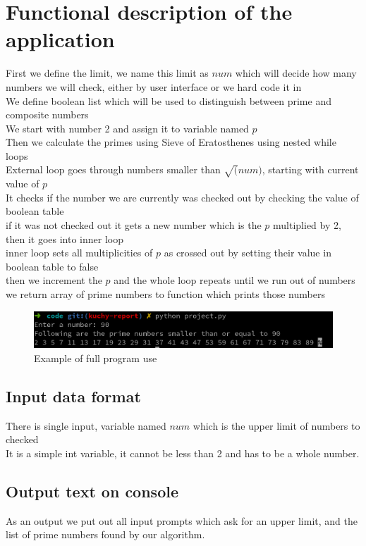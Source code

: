 \documentclass[12pt]{article}
\begin{document}
\section{Functional description of the application}
First we define the limit, we name this limit as $num$ which will decide how many numbers we will check, either by user interface or we hard code it in \\ 
We define boolean list which will be used to distinguish between prime and composite numbers \\ 
We start with number 2 and assign it to variable named $p$ \\ 
Then we calculate the primes using Sieve of Eratosthenes using nested while loops \\ 
External loop goes through numbers smaller than $\sqrt(num)$, starting with current value of $p$ \\ 
It checks if the number we are currently was checked out by checking the value of boolean table \\ 
if it was not checked out it gets a new number which is the $p$ multiplied by 2, then it goes into inner loop \\ 
inner loop sets all multiplicities of $p$ as crossed out by setting their value in boolean table to false \\ 
then we increment the $p$ and the whole loop repeats until we run out of numbers \\ 
we return array of prime numbers to function which prints those numbers 

\begin{figure}[H]
    \caption{Example of full program use }
\centering
\includegraphics[width=\textwidth]
{screenshoot/program_use.png}
\end{figure}

\subsection{Input data format}
There is single input, variable named $num$ which is the upper limit of numbers to checked \\ 
It is a simple int variable, it cannot be less than 2 and has to be a whole number. 
\subsection{Output text on console}
As an output we put out all input prompts which ask for an upper limit, and the list of prime numbers found by our algorithm. 
\end{document}
